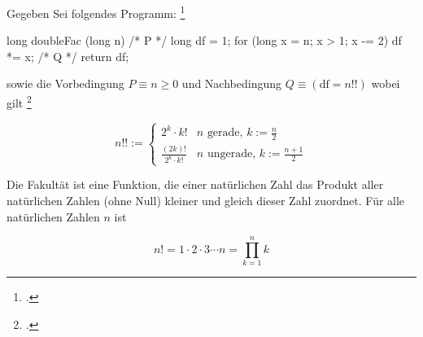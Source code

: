 \documentclass{bschlangaul-aufgabe}
\begin{document}

\let\wp=\bWpKalkuelOhneMathe

Gegeben Sei folgendes Programm:
\footcite[Thema 2 Teilaufgabe 2 Aufgabe 3]{examen:66116:2015:09}

\begin{bJavaAngabe}
long doubleFac (long n) {
  /* P */ long df = 1;
  for (long x = n; x > 1; x -= 2) {
    df *= x;
  } /* Q */
  return df;
}
\end{bJavaAngabe}

\noindent
sowie die Vorbedingung $P \equiv n \geq 0$ und Nachbedingung $Q \equiv
(\text{df} = n!!)$ wobei gilt
\footcite{sosy:ab:8}

\begin{equation*}
n!! :=
\begin{cases}
2^k \cdot k! & n\text{ gerade, }k := \frac{n}{2} \\
\frac{(2k)!}{2^k \cdot k!}& n\text{ ungerade, }k := \frac{n+1}{2}
\end{cases}
\end{equation*}

%

\begin{bExkurs}[Fakultät]
Die Fakultät ist eine Funktion, die einer natürlichen Zahl
das Produkt aller natürlichen Zahlen (ohne Null) kleiner und gleich
dieser Zahl zuordnet.
%
Für alle natürlichen Zahlen $n$ ist

\begin{displaymath}
 n! = 1 \cdot 2 \cdot 3 \dotsm n=\prod_{k=1}^{n}k
\end{displaymath}

\end{bExkurs}

%
\end{document}
